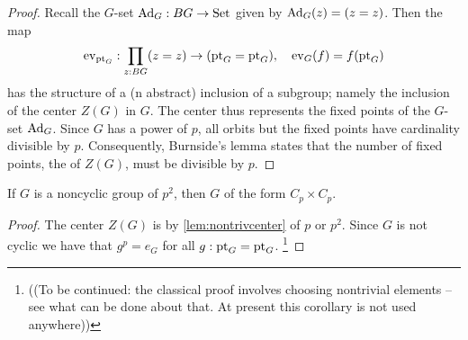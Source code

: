 \begin{proof}
  Recall the $G$-set $\mathrm{Ad}_G:BG\to\mathord{\mathrm{Set}}$ given by $\mathrm{Ad}_G(z)=(z=z)$.  
Then the map  
$$\mathrm{ev}_{{\mathord{\mathrm{pt}}}_G}:\prod_{z:BG}(z=z)\to({\mathord{\mathrm{pt}}}_G={\mathord{\mathrm{pt}}}_G),\quad \mathrm{ev}_G(f)=f({\mathord{\mathrm{pt}}}_G)$$  
has the structure of a (n abstract) inclusion of a subgroup; namely the inclusion of the center $Z(G)$ in $G$.  
The center thus represents the fixed points of the $G$-set $\mathrm{Ad}_G$.  
Since $G$ has \gporder a power of $p$, all orbits but the fixed points have cardinality divisible by $p$.  
Consequently, Burnside's lemma states that the number of fixed points, \ie the \gporder of $Z(G)$, must be divisible by $p$.
\end{proof}
\begin{corollary}
  \label{cor:orderpsquaredgroups}
  If $G$ is a noncyclic group of \gporder $p^2$, then $G$ of the form $C_p\times C_p$.
\end{corollary}
\begin{proof}
  The center $Z(G)$ is by \cref{lem:nontrivcenter} of \gporder $p$ or $p^2$.
  Since $G$ is not cyclic we have that $g^p=e_G$ for all $g:{\mathord{\mathrm{pt}}}_G={\mathord{\mathrm{pt}}}_G$.    
\footnote{((To be continued: the classical proof involves choosing nontrivial elements  -- see what can be done about that.  At present this corollary is not used anywhere))}
\end{proof}
